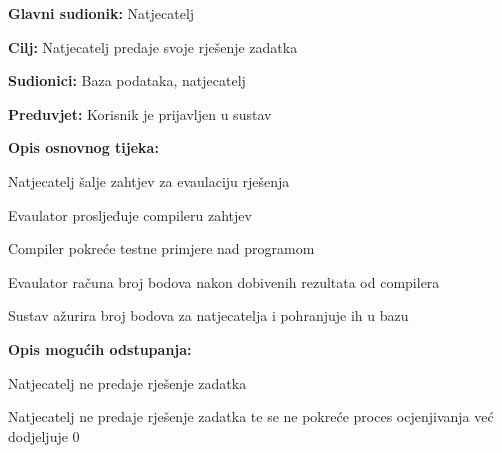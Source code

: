 					
					\noindent {}
					\begin{packed_item}
						
						\item \textbf{Glavni sudionik: }Natjecatelj
						\item  \textbf{Cilj:} Natjecatelj predaje svoje rješenje zadatka 
						\item  \textbf{Sudionici:} Baza podataka, natjecatelj
						\item  \textbf{Preduvjet:} Korisnik je prijavljen u sustav 
						\item  \textbf{Opis osnovnog tijeka:}
						
						\item[] \begin{packed_enum}
							
							\item Natjecatelj šalje zahtjev za evaulaciju rješenja
							\item Evaulator prosljeđuje compileru zahtjev
							\item Compiler pokreće testne primjere nad programom
							\item Evaulator računa broj bodova nakon dobivenih rezultata od compilera
							\item Sustav ažurira broj bodova za natjecatelja i pohranjuje ih u bazu
							
						\end{packed_enum}
						
						\item  \textbf{Opis mogućih odstupanja:}
						
						\item[] \begin{packed_item}
							
							\item[2.a] Natjecatelj ne predaje rješenje zadatka
							\item[] \begin{packed_enum}
								
								\item Natjecatelj ne predaje rješenje zadatka te se ne pokreće proces ocjenjivanja već dodjeljuje 0 
								
							\end{packed_enum}
						\end{packed_item}
					\end{packed_item}
				

